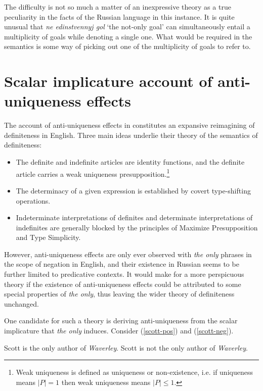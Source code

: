 \documentclass{article}
\begin{document}
The difficulty is not so much a matter of an inexpressive theory as a true peculiarity in the facts of the Russian language in this instance. It is quite unusual that \textit{ne edinstvennyj gol} `the not-only goal' can simultaneously entail a multiplicity of goals while denoting a single one. What would be required in the semantics is some way of picking out one of the multiplicity of goals to refer to.


\section{Scalar implicature account of anti-uniqueness effects}
The account of anti-uniqueness effects in \citet{cb2015, cb2012a} constitutes an expansive reimagining of definiteness in English. Three main ideas underlie their theory of the semantics of definiteness:

\begin{itemize}
	\item The definite and indefinite articles are identity functions, and the definite article carries a weak uniqueness presupposition.\footnote{Weak uniqueness is defined as uniqueness or non-existence, i.e. if uniqueness means $|P| = 1$ then weak uniqueness means $|P| \le 1$.}
	\item The determinacy of a given expression is established by covert type-shifting operations.
	\item Indeterminate interpretations of definites and determinate interpretations of indefinites are generally blocked by the principles of Maximize Presupposition and Type Simplicity.
\end{itemize}

However, anti-uniqueness effects are only ever observed with \textit{the only} phrases in the scope of negation in English, and their existence in Russian seems to be further limited to predicative contexts. It would make for a more perspicuous theory if the existence of anti-uniqueness effects could be attributed to some special properties of \textit{the only}, thus leaving the wider theory of definiteness unchanged.

One candidate for such a theory is deriving anti-uniqueness from the scalar implicature that \textit{the only} induces. Consider (\ref{scott-pos}) and (\ref{scott-neg}).

\begin{exe}
	\ex \label{scott-pos} Scott is the only author of \textit{Waverley}.
	\ex \label{scott-neg} Scott is not the only author of \textit{Waverley}.
\end{exe}
\end{document}
